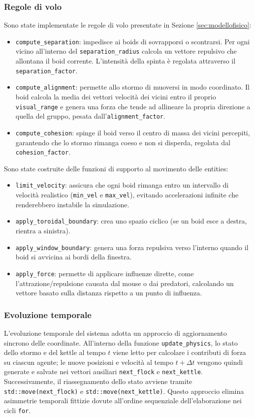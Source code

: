 \documentclass[11pt, a4paper]{article}
\begin{document}
\subsubsection{Regole di volo}
Sono state implementate le regole di volo presentate in Sezione \ref{sec:modellofisico}:
\begin{itemize}
    \item \texttt{compute\_separation}: impedisce ai boids di sovrapporsi o scontrarsi. Per ogni vicino all'interno del \texttt{separation\_radius} calcola un vettore repulsivo che allontana il boid corrente. L'intensità della spinta è regolata attraverso il \texttt{separation\_factor}.
    \item \texttt{compute\_alignment}: permette allo stormo di muoversi in modo coordinato. Il boid calcola la media dei vettori velocità dei vicini entro il proprio \texttt{visual\_range} e genera una forza che tende ad allineare la propria direzione a quella del gruppo, pesata dall'\texttt{alignment\_factor}.
    \item \texttt{compute\_cohesion}: spinge il boid verso il centro di massa dei vicini percepiti, garantendo che lo stormo rimanga coeso e non si disperda, regolata dal \texttt{cohesion\_factor}.
\end{itemize}
Sono state costruite delle funzioni di supporto al movimento delle entities:
\begin{itemize}
    \item \texttt{limit\_velocity}: assicura che ogni boid rimanga entro un intervallo di velocità realistico (\texttt{min\_vel} e \texttt{max\_vel}), evitando accelerazioni infinite che renderebbero instabile la simulazione.
    \item \texttt{apply\_toroidal\_boundary}: crea uno spazio ciclico (se un boid esce a destra, rientra a sinistra).
    \item \texttt{apply\_window\_boundary}: genera una forza repulsiva verso l'interno quando il boid si avvicina ai bordi della finestra.
    \item \texttt{apply\_force}: permette di applicare influenze dirette, come l'attrazione/repulsione causata dal mouse o dai predatori, calcolando un vettore basato sulla distanza rispetto a un punto di influenza.
\end{itemize}

\subsubsection{Evoluzione temporale}
L'evoluzione temporale del sistema adotta un approccio di aggiornamento sincrono delle coordinate. All'interno della funzione \texttt{update\_physics}, lo stato dello stormo e del kettle al tempo $t$ viene letto per calcolare i contributi di forza su ciascun agente; le nuove posizioni e velocità al tempo $t+\Delta t$ vengono quindi generate e salvate nei vettori ausiliari \texttt{next\_flock} e \texttt{next\_kettle}. Successivamente, il riassegnamento dello stato avviene tramite \texttt{std::move(next\_flock)} e \texttt{std::move(next\_kettle)}. Questo approccio elimina asimmetrie temporali fittizie dovute all'ordine sequenziale dell'elaborazione nei cicli \texttt{for}.
\end{document}
